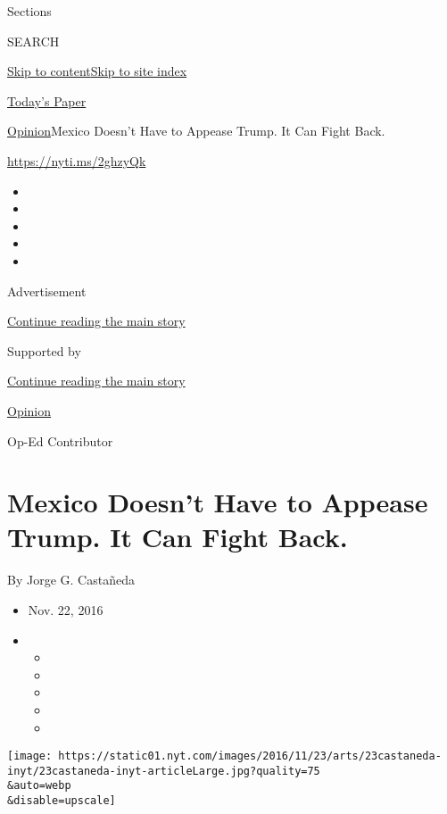 Sections

SEARCH

\protect\hyperlink{site-content}{Skip to
content}\protect\hyperlink{site-index}{Skip to site index}

\href{https://myaccount.nytimes.com/auth/login?response_type=cookie\&client_id=vi}{}

\href{https://www.nytimes.com/section/todayspaper}{Today's Paper}

\href{/section/opinion}{Opinion}\textbar{}Mexico Doesn't Have to Appease
Trump. It Can Fight Back.

\url{https://nyti.ms/2ghzyQk}

\begin{itemize}
\item
\item
\item
\item
\item
\end{itemize}

Advertisement

\protect\hyperlink{after-top}{Continue reading the main story}

Supported by

\protect\hyperlink{after-sponsor}{Continue reading the main story}

\href{/section/opinion}{Opinion}

Op-Ed Contributor

\hypertarget{mexico-doesnt-have-to-appease-trump-it-can-fight-back}{%
\section{Mexico Doesn't Have to Appease Trump. It Can Fight
Back.}\label{mexico-doesnt-have-to-appease-trump-it-can-fight-back}}

By Jorge G. Castañeda

\begin{itemize}
\item
  Nov. 22, 2016
\item
  \begin{itemize}
  \item
  \item
  \item
  \item
  \item
  \end{itemize}
\end{itemize}

\texttt{[image: https://static01.nyt.com/images/2016/11/23/arts/23castaneda-inyt/23castaneda-inyt-articleLarge.jpg?quality=75\\\&auto=webp\\\&disable=upscale]}

